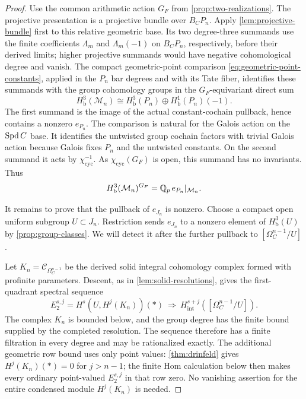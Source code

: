 \begin{proof}
Use the common arithmetic action $G_F$ from
\cref{prop:two-realizations}.
The projective presentation is a projective bundle over $B_CP_n$.
Apply \cref{lem:projective-bundle} first to this relative geometric
base.  Its two degree-three summands use the finite coefficients
$\Lambda_m$ and $\Lambda_m(-1)$ on $B_CP_n$, respectively, before
their derived limits; higher projective summands would have negative
cohomological degree and vanish.  The compact geometric-point comparison
\eqref{eq:geometric-point-constants}, applied in the $P_n$ bar degrees
and with its Tate fiber, identifies these summands with the group
cohomology groups in the $G_F$-equivariant direct sum
\begin{equation}\label{eq:projective-degree-three}
 H^3_{\mathrm b}(\mathcal M_n)
 \cong H^3_{\mathrm b}(P_n)
          \oplus H^1_{\mathrm b}(P_n)(-1).
\end{equation}
The first summand is the image of the actual constant-cochain pullback,
hence contains a nonzero $e_{P_n}$.  The comparison is natural for the
Galois action on the $\operatorname{Spd} C$ base.  It identifies the untwisted group
cochain factors with trivial Galois action because Galois fixes $P_n$
and the untwisted constants.
On the second summand it acts by $\chi_{\mathrm{cyc}}^{-1}$.
As $\chi_{\mathrm{cyc}}(G_F)$ is open, this summand has no invariants.
Thus
\begin{equation}\label{eq:invariant-line}
 H^3_{\mathrm b}(\mathcal M_n)^{G_F}
       =\mathbb Q_p\,e_{P_n}|_{\mathcal M_n}.
\end{equation}

It remains to prove that the pullback of $e_{J_n}$ is nonzero.
Choose a compact open uniform subgroup $U\subset J_n$.
Restriction sends $e_{J_n}$ to a nonzero element of
$H^3_{\mathrm b}(U)$ by \cref{prop:group-classes}.
We will detect it after the further pullback to $[\Omega_C^{n-1}/U]$.

Let $K_n=\mathscr C_{\Omega_C^{n-1}}$ be the derived solid integral
cohomology complex formed with profinite parameters.
Descent, as in \cref{lem:solid-resolutions}, gives the first-quadrant
spectral sequence
\begin{equation}\label{eq:drinfeld-descent}
 E_2^{s,j}=H^s(U,H^j(K_n))(*)
 \ \Longrightarrow\
 H_{\mathrm{int}}^{s+j}([\Omega_C^{n-1}/U]).
\end{equation}
The complex $K_n$ is bounded below, and the group degree has the finite
bound supplied by the completed resolution.  The sequence therefore
has a finite filtration in every degree and may be rationalized
exactly.  The additional geometric row bound uses only point values:
\cref{thm:drinfeld} gives $H^j(K_n)(*)=0$ for $j>n-1$;
the finite Hom calculation below then makes every ordinary
point-valued $E_2^{s,j}$ in that row zero.  No vanishing assertion for
the entire condensed module $H^j(K_n)$ is needed.


\end{proof}
